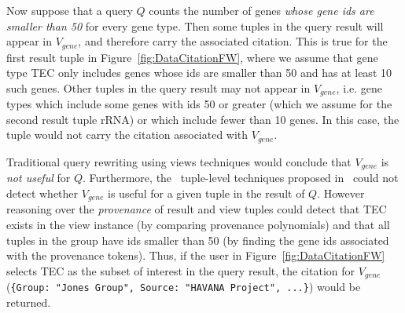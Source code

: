 
Now suppose that a query $Q$ counts the number of genes \textit{whose gene ids are smaller than 50} for every gene type. Then some tuples in the query result will appear in $V_{gene}$, and therefore carry the associated citation.  This is true for the first result tuple in Figure~\ref{fig:DataCitationFW},  where we assume that gene type TEC only includes genes whose ids are smaller than 50 and has at least 10 such genes.  Other tuples in the query result may not appear in $V_{gene}$, i.e. gene types which include some genes with ids 50 or greater (which we assume for the second result tuple rRNA)  or which include fewer than 10 genes.  In this case, the tuple would not carry the citation associated with $V_{gene}$.

Traditional query rewriting using views techniques would conclude that $V_{gene}$ is {\em not useful} for $Q$.  Furthermore, the \rba\ tuple-level techniques proposed in~\cite{wu2018data} could not detect whether $V_{gene}$ is useful for a given tuple in the result of $Q$.
However reasoning over the {\em provenance} of result  and view tuples could detect that TEC exists in the view instance (by comparing provenance polynomials) and that all tuples in the group have ids smaller than 50 (by finding the gene ids associated with the provenance tokens).  Thus, if the user in Figure~\ref{fig:DataCitationFW} selects TEC as the subset of interest in the query result, the citation for $V_{gene}$ ({\tt \{Group: "Jones Group", Source: "HAVANA Project", ...\}}) would be returned.

